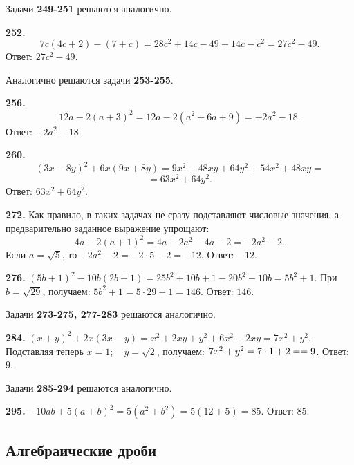 Задачи \textbf{249-251} решаются аналогично.

\textbf{252.} $$7c\left(4c+2\right)-\left(7+c\right)=28c^2+14c-49-14c-c^2=27c^2-49.$$ \newline \null \hspace*{\fill}Ответ: $27c^2-49$.

Аналогично решаются задачи \textbf{253-255}.

\textbf{256.} $$12a-2\left(a+3\right)^2=12a-2\left(a^2+6a+9\right)=-2a^2-18.$$
\newline \null \hspace*{\fill} Ответ: $-2a^2-18$. 

\textbf{260.} $$\left(3x-8y\right)^2+6x\left(9x+8y\right)=9x^2-48xy+64y^2+54x^2+48xy=$$ $$=63x^2+64y^2.$$ \newline \null \hspace*{\fill} Ответ: $63x^2+64y^2$. 

\textbf{272.}  Как правило, в таких задачах не сразу подставляют числовые значения, а предварительно заданное выражение упрощают: $$4a-2\left(a+1\right)^2=4a-2a^2-4a-2=-2a^2-2.$$ Если $a=\sqrt{5}$, то $-2a^2-2=-2\cdot5-2=-12.$ \newline \null \hspace*{\fill} Ответ: $-12$. 

\textbf{276.} $\left(5b+1\right)^2-10b\left(2b+1\right)=25b^2+10b+1-20b^2-10b=5b^2+1.$ При $b=\sqrt{29}$, получаем: $5b^2+1=5\cdot29+1=146$. \newline \null \hspace*{\fill} Ответ: $146$.

Задачи \textbf{273-275, 277-283} решаются аналогично. 

\textbf{284.} $\left(x+y\right)^2+2x(3x-y)=x^2+2xy+y^2+6x^2-2xy=7x^2+y^2$. Подставляя теперь $x=1;\quad y=\sqrt{2}$, получаем: $7x^2+y^2=7\cdot1+2=\linebreak=9$. \newline \null \hspace*{\fill} Ответ: $9$. 

Задачи  \textbf{285-294}  решаются аналогично. 

\textbf{295.} $-10ab+5\left(a+b\right)^2=5\left(a^2+b^2\right)=5\left(12+5\right)=85$.  \null \hspace*{\fill} Ответ: $85$. 

\newpage \subsection{Алгебраические дроби}


